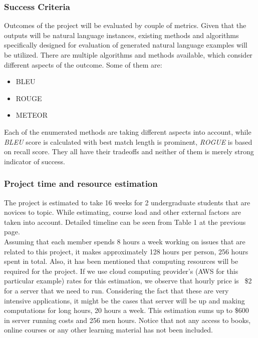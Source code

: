 \documentclass{mefsdp}
\begin{document}
	\subsubsection{Success Criteria}
	Outcomes of the project will be evaluated by couple of metrics. Given that the outputs will be natural language instances, existing methods and algorithms specifically designed for evaluation of generated natural language examples will be utilized. There are multiple algorithms and methods available, which consider different aspects of the outcome. Some of them are:
	\begin{itemize}
		\item BLEU
		\item ROUGE
		\item METEOR\\
	\end{itemize}
	
	Each of the enumerated methods are taking different aspects into account, while \textit{BLEU} score is calculated with best match length is prominent, \textit{ROGUE} is based on recall score. They all have their tradeoffs and neither of them is merely strong indicator of success.
	
	\subsubsection{Project time and resource estimation}
	The project is estimated to take 16 weeks for 2 undergraduate students that are novices to topic. While estimating, course load and other external factors are taken into account. Detailed timeline can be seen from Table 1 at the previous page. \\
	
	Assuming that each member spends 8 hours a week working on issues that are related to this project, it makes approximately 128 hours per person, 256 hours spent in total. Also, it has been mentioned that computing resources will be required for the project. If we use cloud computing provider’s (AWS for this particular example) rates for this estimation, we observe that hourly price is ~\$2 for a server that we need to run. Considering the fact that these are very intensive applications, it might be the cases that server will be up and making computations for long hours, 20 hours a week. This estimation sums up to \$600 in server running costs and 256 men hours. Notice that not any access to books, online courses or any other learning material has not been included.
	
\end{document}

